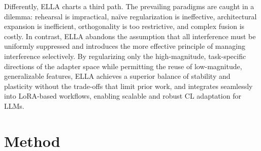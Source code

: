 \documentclass[11pt]{article}
\begin{document}
Differently, ELLA charts a third path. The prevailing paradigms are caught in a dilemma: rehearsal is impractical, naïve regularization is ineffective, architectural expansion is inefficient, orthogonality is too restrictive, and complex fusion is costly. In contrast, ELLA abandons the assumption that all interference must be uniformly suppressed and introduces the more effective principle of managing interference selectively. By regularizing only the high-magnitude, task-specific directions of the adapter space while permitting the reuse of low-magnitude, generalizable features, ELLA achieves a superior balance of stability and plasticity without the trade-offs that limit prior work, and integrates seamlessly into LoRA-based workflows, enabling scalable and robust CL adaptation for LLMs.

\section{Method}
\end{document}
